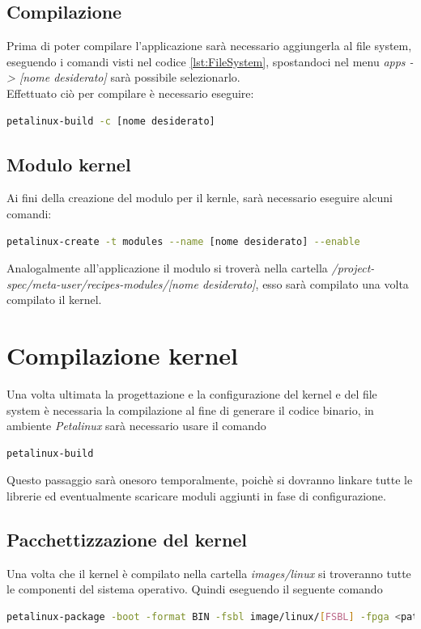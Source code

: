 \subsection{Compilazione}
Prima di poter compilare l'applicazione sarà necessario aggiungerla al file system, eseguendo i comandi visti nel codice \ref{lst:FileSystem}, spostandoci nel menu \textit{apps -> [nome desiderato]} sarà possibile selezionarlo.\\
Effettuato ciò per compilare è necessario eseguire:
\begin{lstlisting}[language=sh, label=lst:sh, caption={Comando necessario alla compilazione dell'applicazione}]
petalinux-build -c [nome desiderato]
\end{lstlisting}
\subsection{Modulo kernel}
Ai fini della creazione del modulo per il kernle, sarà necessario eseguire alcuni comandi:
\begin{lstlisting}[language=sh, label=lst:sh, caption={Comando necessario alla creazione del modulo kernel}]
petalinux-create -t modules --name [nome desiderato] --enable
\end{lstlisting}
Analogalmente all'applicazione il modulo si troverà nella cartella \textit{/project-spec/meta-user/recipes-modules/[nome desiderato]}, esso sarà compilato una volta compilato il kernel.

\section{Compilazione kernel}
Una volta ultimata la progettazione e la configurazione del kernel e del file system è necessaria la compilazione al fine di generare il codice binario, in ambiente \textit{Petalinux} sarà necessario usare il comando
\begin{lstlisting}[language=sh, label=lst:sh, caption={Comando necessario alla compilazione del kernel}]
petalinux-build
\end{lstlisting}
Questo passaggio sarà onesoro temporalmente, poichè si dovranno linkare tutte le librerie ed eventualmente scaricare moduli aggiunti in fase di configurazione.
\subsection{Pacchettizzazione del kernel}
Una volta che il kernel è compilato nella cartella \textit{images/linux} si troveranno tutte le componenti del sistema operativo. Quindi eseguendo il seguente comando
\begin{lstlisting}[language=sh, label=lst:sh, caption={Comando necessario alla pacchettizzazione del kernel}]
petalinux-package -boot -format BIN -fsbl image/linux/[FSBL] -fpga <path/to/bitstream> -u-boot
\end{lstlisting}
